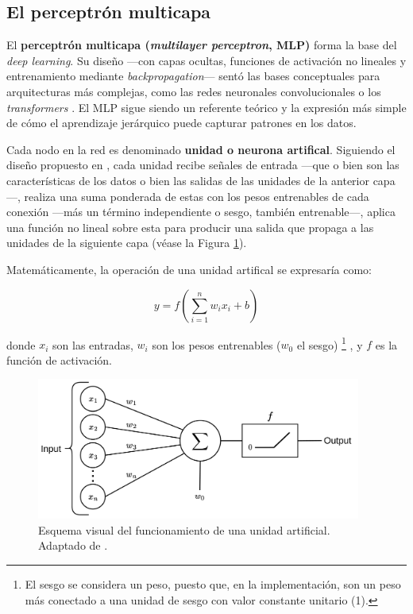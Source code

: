 \subsection{El perceptrón multicapa}

El \textbf{perceptrón multicapa (\textit{multilayer perceptron}, MLP)} forma la base del \textit{deep 
learning}. Su diseño ---con capas ocultas, funciones de activación no lineales y entrenamiento  mediante 
\textit{backpropagation}--- sentó las bases conceptuales para arquitecturas más complejas, como las redes 
neuronales convolucionales o los \textit{transformers} \cite{murphy2022}. El MLP sigue siendo un referente 
teórico y la expresión más simple de cómo el aprendizaje jerárquico puede capturar patrones en los datos. 

Cada nodo en la red es denominado \textbf{unidad o neurona artifical}. Siguiendo el diseño propuesto en 
\cite{mcculloch1943,rosenblatt1958}, cada unidad recibe señales de entrada ---que o bien son las 
características de los datos o bien las salidas de las unidades de la anterior capa---, realiza una suma 
ponderada de estas con los pesos entrenables de cada conexión ---más un término independiente o sesgo, también 
entrenable---, aplica una función no lineal sobre esta para producir una salida que propaga a las unidades de 
la siguiente capa (véase la Figura \ref{fig:neuron_MLP}).

Matemáticamente, la operación de una unidad artifical se expresaría como:

$$
y = f \left( \sum_{i=1}^n{w_ix_i+b} \right)
$$

donde $x_i$ son las entradas, $w_i$ son los pesos entrenables ($w_0$ el sesgo)
\footnote{
    El sesgo se considera un peso, puesto que, en la implementación, son un peso más conectado a una unidad
    de sesgo con valor constante unitario (1).
}
, y $f$ es la función de activación.

\begin{figure}[h]
    \centering
    \includegraphics[width=0.95\textwidth]{capitulos/cap_02/imagenes/Neuron_perceptron.png}
    \caption{
        Esquema visual del funcionamiento de una unidad artificial. Adaptado de 
        \cite{codeworld2022understandingMLDL}.
    } 
    \label{fig:neuron_MLP}
\end{figure}


